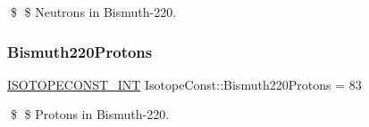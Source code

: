 \$ \$ Neutrons in Bismuth-\/220. \mbox{\label{group___isotope_const-_bismuth-_bi220_gae932cf481b2de9f06b8bf831b2d5b05d}} 
\subsubsection{\texorpdfstring{Bismuth220\+Protons}{Bismuth220Protons}}
{\footnotesize\ttfamily \mbox{\hyperlink{group___isotope_const-_macros_ga5f18360b3e99483a35c32d789e62621c}{I\+S\+O\+T\+O\+P\+E\+C\+O\+N\+S\+T\+\_\+\+I\+NT}} Isotope\+Const\+::\+Bismuth220\+Protons = 83}

\$ \$ Protons in Bismuth-\/220. 